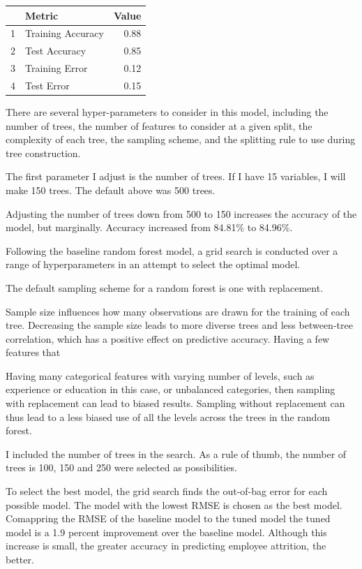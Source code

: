\documentclass[11pt,preprint, authoryear]{elsarticle}
\let\origtable\table
\let\endorigtable\endtable
\renewenvironment{table}[1][2] {
    \expandafter\origtable\expandafter[H]
} {
    \endorigtable
}
\numberwithin{equation}{section}
\numberwithin{figure}{section}
\numberwithin{table}{section}
\begin{document}
\begin{table}[H]
\centering
\begin{tabular}{rlr}
  \hline
 & Metric & Value \\ 
  \hline
1 & Training Accuracy & 0.88 \\ 
  2 & Test Accuracy & 0.85 \\ 
  3 & Training Error & 0.12 \\ 
  4 & Test Error & 0.15 \\ 
   \hline
\end{tabular}
\caption{More Metrics for Baseline Random Forest \label{tab1}} 
\end{table}

There are several hyper-parameters to consider in this model, including
the number of trees, the number of features to consider at a given
split, the complexity of each tree, the sampling scheme, and the
splitting rule to use during tree construction.

The first parameter I adjust is the number of trees. If I have 15
variables, I will make 150 trees. The default above was 500 trees.

Adjusting the number of trees down from 500 to 150 increases the
accuracy of the model, but marginally. Accuracy increased from 84.81\%
to 84.96\%.

Following the baseline random forest model, a grid search is conducted
over a range of hyperparameters in an attempt to select the optimal
model.

The default sampling scheme for a random forest is one with replacement.

Sample size influences how many observations are drawn for the training
of each tree. Decreasing the sample size leads to more diverse trees and
less between-tree correlation, which has a positive effect on predictive
accuracy. Having a few features that

Having many categorical features with varying number of levels, such as
experience or education in this case, or unbalanced categories, then
sampling with replacement can lead to biased results. Sampling without
replacement can thus lead to a less biased use of all the levels across
the trees in the random forest.

I included the number of trees in the search. As a rule of thumb, the
number of trees is 100, 150 and 250 were selected as possibilities.

To select the best model, the grid search finds the out-of-bag error for
each possible model. The model with the lowest RMSE is chosen as the
best model. Comappring the RMSE of the baseline model to the tuned model
the tuned model is a 1.9 percent improvement over the baseline model.
Although this increase is small, the greater accuracy in predicting
employee attrition, the better.
\end{document}
